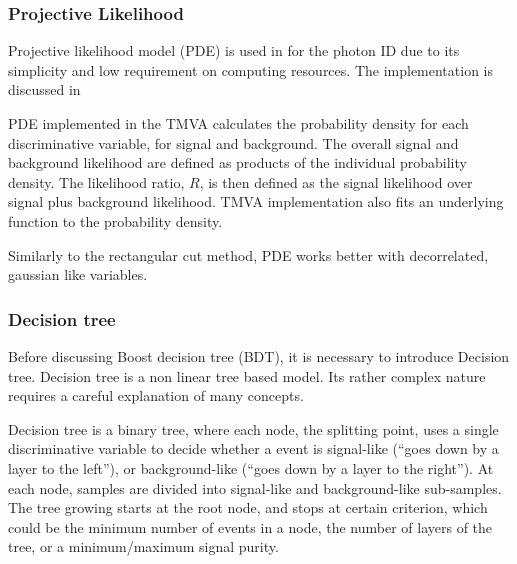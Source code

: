 \subsubsection{Projective Likelihood}

Projective likelihood model (PDE) is used in \pandora for the photon ID  due to its simplicity and low requirement on computing resources. The \pandora implementation is discussed  in 

PDE implemented in the TMVA calculates the probability density for each discriminative variable, for signal and background. The overall signal and background likelihood are defined as products of the individual probability density. The likelihood ratio, $R$, is then defined as the signal likelihood over signal plus background likelihood. TMVA implementation also fits an underlying function to the probability density.


Similarly to the rectangular cut method, PDE works better with decorrelated, gaussian like variables.



\subsubsection{Decision tree}
\label{sec:pandoraDecisionTree}
 
Before discussing Boost decision tree (BDT), it is necessary to introduce Decision tree. Decision tree is a non linear tree based model. Its rather complex nature requires a careful explanation of many concepts.

Decision tree is a binary tree, where each node, the splitting point, uses a single discriminative variable to decide whether a event is signal-like (``goes down by a layer to the left''), or background-like (``goes down by a layer to the right''). At each node, samples are divided into signal-like and background-like sub-samples. The tree growing starts at the root node, and stops at certain criterion, which could be the minimum number of events in a node, the number of layers of the tree, or a minimum/maximum signal purity.

